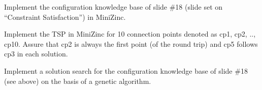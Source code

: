 \documentclass[10pt, a4paper]{article}
\begin{document}

Implement the configuration knowledge base of slide \#18 (slide set on “Constraint Satisfaction”) in MiniZinc.






Implement the TSP in MiniZinc for 10 connection points denoted as {cp1, cp2, .., cp10}. Assure that cp2 is always the first point (of the round trip) and cp5 follows cp3 in each solution.




Implement a solution search for the configuration knowledge base of slide \#18 (see above) on the basis of a genetic algorithm.


\pagebreak
\end{document}
